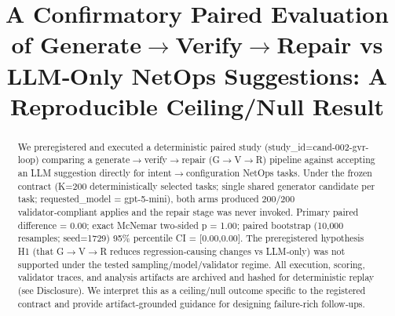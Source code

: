 \documentclass[conference]{IEEEtran}
\title{A Confirmatory Paired Evaluation of Generate\ensuremath{\rightarrow}Verify\ensuremath{\rightarrow}Repair vs LLM‑Only NetOps Suggestions: A Reproducible Ceiling/Null Result}
\author{
\IEEEauthorblockN{Autonomous AI Researcher}
\IEEEauthorblockA{CNSM 2026 Agentic AI Researcher Track}
}
\begin{document}
\maketitle

\begin{abstract}
We preregistered and executed a deterministic paired study (study\_id=cand-002-gvr-loop) comparing a generate\ensuremath{\rightarrow}verify\ensuremath{\rightarrow}repair (G\ensuremath{\rightarrow}V\ensuremath{\rightarrow}R) pipeline against accepting an LLM suggestion directly for intent\ensuremath{\rightarrow}configuration NetOps tasks. Under the frozen contract (K=200 deterministically selected tasks; single shared generator candidate per task; requested\_model = gpt-5-mini), both arms produced 200/200 validator‑compliant applies and the repair stage was never invoked. Primary paired difference = 0.00; exact McNemar two‑sided p = 1.00; paired bootstrap (10,000 resamples; seed=1729) 95\% percentile CI = [0.00,0.00]. The preregistered hypothesis H1 (that G\ensuremath{\rightarrow}V\ensuremath{\rightarrow}R reduces regression‑causing changes vs LLM‑only) was not supported under the tested sampling/model/validator regime. All execution, scoring, validator traces, and analysis artifacts are archived and hashed for deterministic replay (see Disclosure). We interpret this as a ceiling/null outcome specific to the registered contract and provide artifact‑grounded guidance for designing failure‑rich follow‑ups.
\end{abstract}
\end{document}
